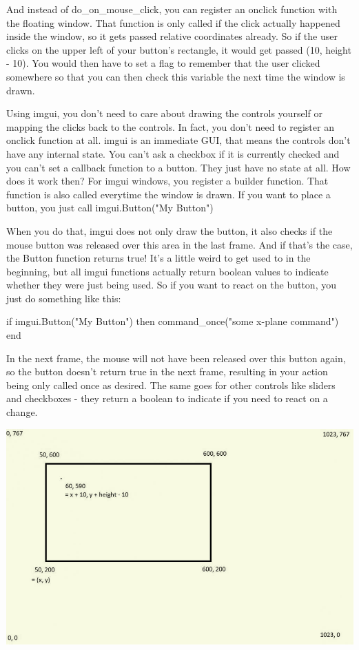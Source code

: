 \documentclass[11pt,parskip=half,a4paper]{scrartcl}
\begin{document}
And instead of do\_on\_mouse\_click, you can register an onclick function with the floating window.
That function is only called if the click actually happened inside the window, so it gets passed relative
coordinates already. So if the user clicks on the upper left of your button's rectangle, it would get
passed (10, height - 10). You would then have to set a flag to remember that the user clicked
somewhere so that you can then check this variable the next time the window is drawn.

Using imgui, you don't need to care about drawing the controls yourself or mapping the clicks back to
the controls. In fact, you don't need to register an onclick function at all. imgui is an immediate GUI,
that means the controls don't have any internal state. You can't ask a checkbox if it is currently checked
and you can't set a callback function to a button. They just have no state at all. How does it work then?
For imgui windows, you register a builder function. That function is also called everytime the window
is drawn. If you want to place a button, you just call
imgui.Button("My Button")

When you do that, imgui does not only draw the button, it also checks if the mouse button was released
over this area in the last frame. And if that's the case, the Button function returns true! It's a little weird
to get used to in the beginning, but all imgui functions actually return boolean values to indicate
whether they were just being used. So if you want to react on the button, you just do something like
this:

if imgui.Button("My Button") then \newline
\hspace*{10mm}	command\_once("some x-plane command") \newline
end

In the next frame, the mouse will not have been released over this button again, so the button doesn't
return true in the next frame, resulting in your action being only called once as desired. The same goes
for other controls like sliders and checkboxes - they return a boolean to indicate if you need to react on
a change.

\newpage
\begin{center}
\includegraphics[width=15cm]{FlyWithLuaFloatingWindow.jpg}
\end{center}
\end{document}
